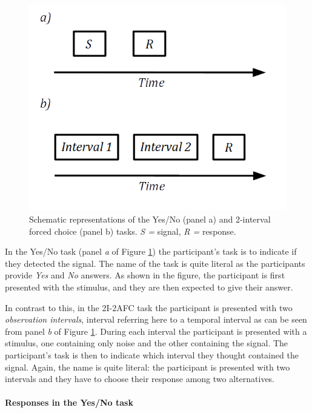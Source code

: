 \documentclass{article}\usepackage{knitr}
\begin{document}
\begin{figure}[!htb]
\centering
\includegraphics[scale = 0.5]{YesNoAfc}
\caption{Schematic representations of the Yes/No (panel a) and 2-interval forced choice (panel b) tasks. \textit{S = } signal, \textit{R =} response.}
\label{fig:YesNoAfc}
\end{figure}

In the Yes/No task (panel \textit{a} of Figure \ref{fig:YesNoAfc}) the participant's task is to indicate if they detected the signal. The name of the task is quite literal as the participants provide \textit{Yes} and \textit{No} answers. As shown in the figure, the participant is first presented with the stimulus, and they are then expected to give their answer.

In contrast to this, in the 2I-2AFC task the participant is presented with two \textit{observation intervals}, interval referring here to a temporal interval as can be seen from panel \textit{b} of Figure \ref{fig:YesNoAfc}. During each interval the participant is presented with a stimulus, one containing only noise and the other containing the signal. The participant's task is then to indicate which interval they thought contained the signal. Again, the name is quite literal: the participant is presented with two intervals and they have to choose their response among two alternatives.

\paragraph{Responses in the Yes/No task}
\end{document}
